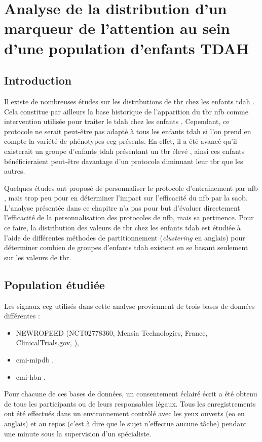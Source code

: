 \chapter{Analyse de la distribution d'un marqueur de l'attention au sein d'une population d'enfants TDAH} \label{chapitre-4}

\section*{Introduction}
Il existe de nombreuses études sur les distributions de \gls{tbr} chez les enfants \gls{tdah}
\citep{Arns2013, Clarke2001, Zhang2017}. Cela constitue par ailleurs la base historique de l'apparition du \gls{tbr} \gls{nfb} comme intervention utilisée
pour traiter le \gls{tdah} chez les enfants \citep{Arnold2014, Deilami2016, Gevensleben2009, VanDongen2013}. Cependant, ce protocole ne serait 
peut-être pas adapté à tous les enfants \gls{tdah} si 
l'on prend en compte la variété de phénotypes \gls{eeg} présents. En effet, il a été avancé qu'il existerait un groupe d'enfants \gls{tdah} présentant un \gls{tbr} élevé 
\citep{Zhang2017, Clarke2011}, ainsi ces enfants bénéficieraient peut-être davantage d'un protocole diminuant leur \gls{tbr} que les autres. 

Quelques études ont proposé de personnaliser le protocole d'entrainement par \gls{nfb} \citep{Bazanova2018, Escolano2014}, mais trop peu pour en déterminer
l'impact sur l'efficacité du \gls{nfb} par la \gls{saob}. L'analyse présentée dans ce chapitre n'a pas pour but d'évaluer directement l'efficacité de la 
personnalisation des protocoles de \gls{nfb}, mais sa pertinence. Pour ce faire, la distribution des valeurs de \gls{tbr} chez les enfants \gls{tdah} est 
étudiée à l'aide de différentes méthodes de partitionnement (\textit{clustering} en anglais) pour déterminer combien de groupes d'enfants \gls{tdah} existent en se basant seulement sur les 
valeurs de \gls{tbr}. 
\clearpage

\section{Population étudiée}

Les signaux \gls{eeg} utilisés dans cette analyse proviennent de trois bases de données différentes :
\begin{itemize}
\item NEWROFEED (NCT02778360, Mensia Technologies, France, ClinicalTrials.gov, \citet{Bioulac2019}),
\item \gls{cmi-mipdb} \citep{Langer2017, Langer2017b},
\item \gls{cmi-hbn} \citep{Alexander2017, Alexander2017b}.
\end{itemize}
Pour chacune de ces bases de données, un consentement éclairé écrit a été obtenu de tous les participants ou de leurs responsables légaux. Tous les enregistrements
ont été effectués dans un environnement contrôlé avec les yeux ouverts (\gls{eo} en anglais) et au repos (c'est à dire que le sujet n'effectue aucune tâche) 
pendant une minute sous la supervision d'un spécialiste. 

